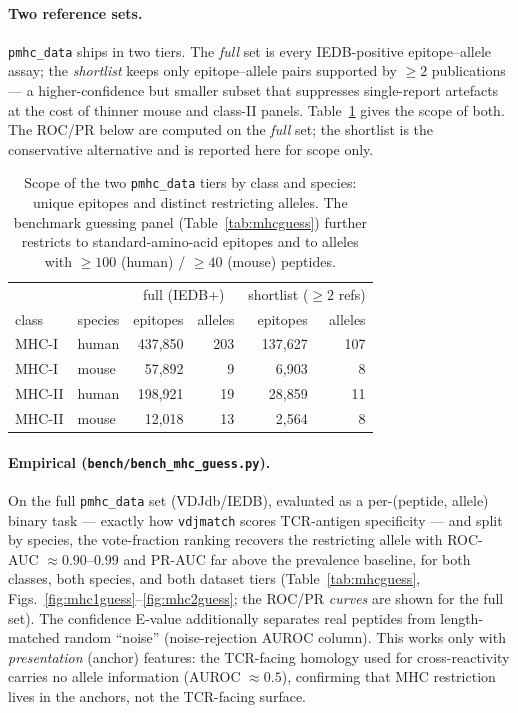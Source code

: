 \documentclass[11pt]{article}
\theoremstyle{oldplain}
\theoremstyle{oldrem}
\begin{document}
\paragraph{Two reference sets.} \texttt{pmhc\_data} ships in two tiers. The \emph{full} set is every
IEDB-positive epitope--allele assay; the \emph{shortlist} keeps only epitope--allele pairs supported
by $\ge2$ publications --- a higher-confidence but smaller subset that suppresses single-report
artefacts at the cost of thinner mouse and class-II panels. Table~\ref{tab:pmhcsets} gives the scope
of both. The ROC/PR below are computed on the \emph{full} set; the shortlist is the conservative
alternative and is reported here for scope only.

\begin{table}[ht]\centering\small
\begin{tabular}{llrrrr}
\hline
 & & \multicolumn{2}{c}{full (IEDB$+$)} & \multicolumn{2}{c}{shortlist ($\ge2$ refs)}\\
class & species & epitopes & alleles & epitopes & alleles\\
\hline
MHC-I  & human & 437{,}850 & 203 & 137{,}627 & 107\\
MHC-I  & mouse &  57{,}892 &   9 &   6{,}903 &   8\\
MHC-II & human & 198{,}921 &  19 &  28{,}859 &  11\\
MHC-II & mouse &  12{,}018 &  13 &   2{,}564 &   8\\
\hline
\end{tabular}
\caption{Scope of the two \texttt{pmhc\_data} tiers by class and species: unique epitopes and distinct
restricting alleles. The benchmark guessing panel (Table~\ref{tab:mhcguess}) further restricts to
standard-amino-acid epitopes and to alleles with $\ge100$ (human) / $\ge40$ (mouse) peptides.}
\label{tab:pmhcsets}
\end{table}

\paragraph{Empirical (\texttt{bench/bench\_mhc\_guess.py}).} On the full \texttt{pmhc\_data} set
(VDJdb/IEDB), evaluated as a per-(peptide, allele) binary task --- exactly how \texttt{vdjmatch} scores
TCR-antigen specificity --- and split by species, the vote-fraction ranking recovers the restricting
allele with
ROC-AUC $\approx 0.90$--$0.99$ and PR-AUC far above the prevalence baseline, for both classes, both
species, and both dataset tiers (Table~\ref{tab:mhcguess}, Figs.~\ref{fig:mhc1guess}--\ref{fig:mhc2guess};
the ROC/PR \emph{curves} are shown for the full set). The
confidence E-value additionally separates real peptides from length-matched random ``noise''
(noise-rejection AUROC column). This works only with \emph{presentation} (anchor) features: the
TCR-facing homology used for cross-reactivity carries no allele information (AUROC $\approx0.5$),
confirming that MHC restriction lives in the anchors, not the TCR-facing surface.
\end{document}
